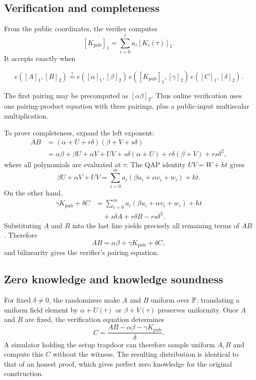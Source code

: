 \subsection{Verification and completeness}

From the public coordinates, the verifier computes
\[
[K_{\mathrm{pub}}]_1
=
\sum_{i=0}^{\ell}a_i[K_i(\tau)]_1.
\]
It accepts exactly when
\begin{tcolorbox}
\[
e([A]_1,[B]_2)
\stackrel{?}{=}
e([\alpha]_1,[\beta]_2)\,
e([K_{\mathrm{pub}}]_1,[\gamma]_2)\,
e([C]_1,[\delta]_2).
\]
\end{tcolorbox}
The first pairing may be precomputed as $[\alpha\beta]_T$. Thus online verification uses one pairing-product equation with three pairings, plus a public-input multiscalar multiplication.

To prove completeness, expand the left exponent:
\begin{align*}
AB
&=(\alpha+U+r\delta)(\beta+V+s\delta)\\
&=\alpha\beta+\beta U+\alpha V+UV
  +s\delta(\alpha+U)+r\delta(\beta+V)+rs\delta^2,
\end{align*}
where all polynomials are evaluated at $\tau$. The QAP identity $UV=W+ht$ gives
\[
\beta U+\alpha V+UV
=\sum_{i=0}^{m}a_i(\beta u_i+\alpha v_i+w_i)+ht.
\]
On the other hand,
\begin{align*}
\gamma K_{\mathrm{pub}}+\delta C
&=\sum_{i=0}^{m}a_i(\beta u_i+\alpha v_i+w_i)+ht\\
&\quad+s\delta A+r\delta B-rs\delta^2.
\end{align*}
Substituting $A$ and $B$ into the last line yields precisely all remaining terms of $AB$. Therefore
\[
AB=\alpha\beta+\gamma K_{\mathrm{pub}}+\delta C,
\]
and bilinearity gives the verifier's pairing equation.

\subsection{Zero knowledge and knowledge soundness}

For fixed $\delta\ne0$, the randomizers make $A$ and $B$ uniform over $\mathbb{F}$: translating a uniform field element by $\alpha+U(\tau)$ or $\beta+V(\tau)$ preserves uniformity. Once $A$ and $B$ are fixed, the verification equation determines
\[
C=\frac{AB-\alpha\beta-\gamma K_{\mathrm{pub}}}{\delta}.
\]
A simulator holding the setup trapdoor can therefore sample uniform $A,B$ and compute this $C$ without the witness. The resulting distribution is identical to that of an honest proof, which gives perfect zero knowledge for the original construction.

